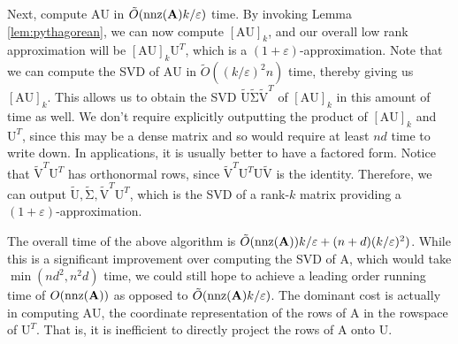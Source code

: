 \documentclass[11pt]{article}
\newcommand{\mat}[1]{{\ensuremath{\bm{\mathrm{#1}}}}}
\def\matA{\mat{A}}
\def\matU{\mat{U}}
\def\matV{\mat{V}}
\def\nnz{{ \rm nnz }}
\newcommand{\eps}{\varepsilon}
\begin{document}
Next, compute $\matA \matU$ in $\tilde{O}(\nnz(\matA)k/\eps)$ time. 
By invoking Lemma \ref{lem:pythagorean}, we can now compute $[\matA \matU]_k$, and our
overall low rank approximation will be $[\matA \matU]_k \matU^T$, which is a $(1+\eps)$-approximation. Note that
we can compute the SVD of $\matA \matU$ in $\tilde{O}((k/\eps)^2 n)$ time, thereby giving us $[\matA \matU]_k$. This allows us
to obtain the SVD $\tilde{\matU} \tilde{\mat\Sigma} \tilde{\matV}^T$ of $[\matA \matU]_k$ in this amount of time as well. 
We don't require
explicitly outputting the product of $[\matA \matU]_k$ and $\matU^T$, since this may be a dense matrix and so would
require at least $nd$ time to write down. In applications, it is usually better to have a factored form.
Notice that $\tilde{\matV}^T \matU^T$ has orthonormal rows, since $\tilde{\matV}^T \matU^T \matU \tilde{\matV}$ 
is the identity.
Therefore, we can output $\tilde{\matU}, \tilde{\mat\Sigma}, \tilde{\matV}^T \matU^T$, which is the SVD of a rank-$k$
matrix providing a $(1+\eps)$-approximation. 

The overall time of the above algorithm is $\tilde{O}(\nnz(\matA))k/\eps + (n+d)(k/\eps)^2)$. While this is a significant
improvement over computing the SVD of $\matA$, which would take $\min(nd^2, n^2d)$ time, we could still
hope to achieve a leading order running time of $O(\nnz(\matA))$ as opposed to $\tilde{O}(\nnz(\matA) k/\eps)$. The dominant
cost is actually in computing $\matA\matU$, 
the coordinate representation of the rows of $\matA$ in the rowspace of $\matU^T$. That
is, it is inefficient to directly project the rows of $\matA$ onto $\matU$. 
\end{document}
